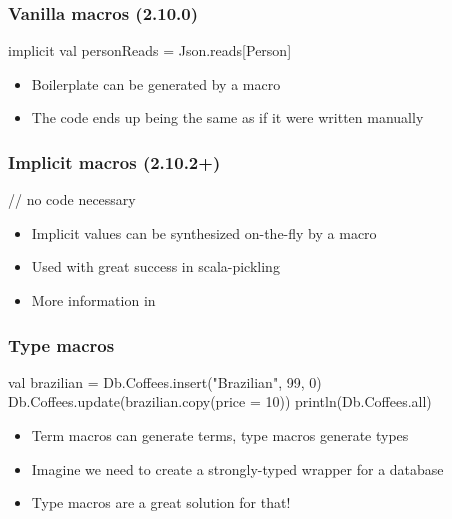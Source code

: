 \documentclass[svgnames,hyperref={bookmarks=false}]{beamer}
\begin{document}
\begin{frame}[fragile]
\frametitle{Vanilla macros (2.10.0)}

\begin{semiverbatim}
implicit val personReads = Json.reads[Person]

\end{semiverbatim}

\begin{itemize}
\item Boilerplate can be generated by a macro
\item The code ends up being the same as if it were written manually
\end{itemize}
\end{frame}

\begin{frame}[fragile]
\frametitle{Implicit macros (2.10.2+)}

\begin{semiverbatim}
// no code necessary

\end{semiverbatim}

\begin{itemize}
\item Implicit values can be synthesized on-the-fly by a macro
\item Used with great success in scala-pickling
\item More information in 
\end{itemize}
\end{frame}

\begin{frame}[fragile]
\frametitle{Type macros}
\begin{semiverbatim}
val brazilian = Db.Coffees.insert("Brazilian", 99, 0)
Db.Coffees.update(brazilian.copy(price = 10))
println(Db.Coffees.all)

\end{semiverbatim}

\begin{itemize}
\item Term macros can generate terms, type macros generate types
\item Imagine we need to create a strongly-typed wrapper for a database
\item Type macros are a great solution for that!
\end{itemize}
\end{frame}
\end{document}
